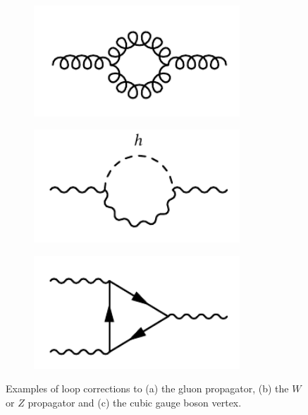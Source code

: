 \begin{figure}
	\centering
	\begin{subfigure}[b]{0.33\linewidth}
		\centering\includegraphics[width=0.85\textwidth]{gluon_loop}
		\caption{\label{fig:gluon_loop}}
	\end{subfigure}%
	\begin{subfigure}[b]{0.33\linewidth}
		\centering\includegraphics[width=0.85\textwidth]{wz_propagator}
		\caption{\label{fig:wz_propagator}}
	\end{subfigure}	
	\begin{subfigure}[b]{0.33\linewidth}
		\centering\includegraphics[width=0.85\textwidth]{cubic_vertex}
		\caption{\label{fig:cubic_vertex}}
	\end{subfigure}
	\caption{Examples of loop corrections to (a) the gluon propagator, (b) the $W$ or $Z$ propagator and (c) the cubic gauge boson vertex.}\label{fig:loop_corrections}
\end{figure}

